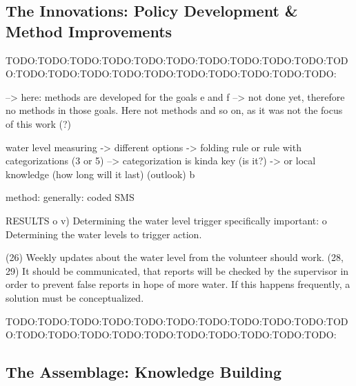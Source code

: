 \subsection{The Innovations: Policy Development \& Method Improvements}
TODO:TODO:TODO:TODO:TODO:TODO:TODO:TODO:TODO:TODO:TODO:TODO:TODO:TODO:TODO:TODO:TODO:TODO:TODO:TODO:TODO:

--> here: methods are developed for the goals e and f --> not done yet, therefore no methods in those goals. Here not methods and so on, as it was not the focus of this work (?)


water level measuring
-> different options
-> folding rule or rule with categorizations (3 or 5) --> categorization is kinda key (is it?)
-> or local knowledge (how long will it last) (outlook) b

method: generally: coded SMS

RESULTS
o	v) Determining the water level trigger
specifically important:
o	Determining the water levels to trigger action.










(26) Weekly updates about the water level from the volunteer should work.
(28, 29) It should be communicated, that reports will be checked by the supervisor in order to prevent false reports in hope of more water. If this happens frequently, a solution must be conceptualized.











TODO:TODO:TODO:TODO:TODO:TODO:TODO:TODO:TODO:TODO:TODO:TODO:TODO:TODO:TODO:TODO:TODO:TODO:TODO:TODO:TODO:
\subsection{The Assemblage: Knowledge Building}


